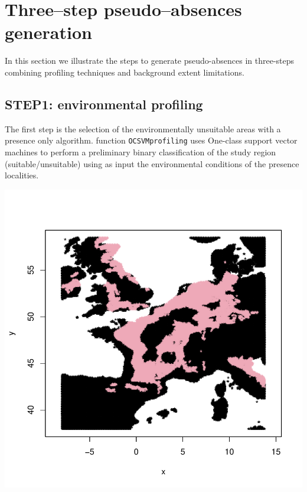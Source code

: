 \documentclass[10pt,a4paper]{article}
\begin{document}
\section{Three--step pseudo--absences generation}

In this section we illustrate the steps to generate pseudo-absences in three-steps combining profiling techniques and background extent limitations. 

\subsection{STEP1: environmental profiling}

The first step is the selection of the environmentally unsuitable areas with a presence only algorithm. function \texttt{OCSVMprofiling} uses One-class support vector machines \citep[OCSVM:][]{scholkopf_learning_2001} to perform a preliminary binary classification of the study region (suitable/unsuitable) using as input the environmental conditions of the presence localities.

\begin{Schunk}
\end{Schunk}
\includegraphics{mopa-mopa7}
\end{document}
